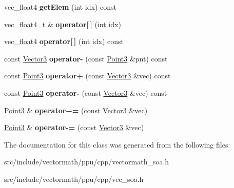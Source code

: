 \begin{DoxyCompactItemize}
\item 
\hypertarget{classVectormath_1_1Soa_1_1Point3_ac83e9baae7843966a73c44aa8ea8f191}{vec\-\_\-float4 {\bfseries get\-Elem} (int idx) const }\label{classVectormath_1_1Soa_1_1Point3_ac83e9baae7843966a73c44aa8ea8f191}

\item 
\hypertarget{classVectormath_1_1Soa_1_1Point3_a8358e39b24ff055400d2949036312a49}{vec\-\_\-float4\-\_\-t \& {\bfseries operator\mbox{[}$\,$\mbox{]}} (int idx)}\label{classVectormath_1_1Soa_1_1Point3_a8358e39b24ff055400d2949036312a49}

\item 
\hypertarget{classVectormath_1_1Soa_1_1Point3_a85d222b26f998d22adeba4b1a9c8506f}{vec\-\_\-float4 {\bfseries operator\mbox{[}$\,$\mbox{]}} (int idx) const }\label{classVectormath_1_1Soa_1_1Point3_a85d222b26f998d22adeba4b1a9c8506f}

\item 
\hypertarget{classVectormath_1_1Soa_1_1Point3_a82c1d800bd31dd5d3926d365d2c1acd0}{const \hyperlink{classVectormath_1_1Soa_1_1Vector3}{Vector3} {\bfseries operator-\/} (const \hyperlink{classVectormath_1_1Soa_1_1Point3}{Point3} \&pnt) const }\label{classVectormath_1_1Soa_1_1Point3_a82c1d800bd31dd5d3926d365d2c1acd0}

\item 
\hypertarget{classVectormath_1_1Soa_1_1Point3_ac77bb6fc67c50a0fe2ce7df62b08f5c4}{const \hyperlink{classVectormath_1_1Soa_1_1Point3}{Point3} {\bfseries operator+} (const \hyperlink{classVectormath_1_1Soa_1_1Vector3}{Vector3} \&vec) const }\label{classVectormath_1_1Soa_1_1Point3_ac77bb6fc67c50a0fe2ce7df62b08f5c4}

\item 
\hypertarget{classVectormath_1_1Soa_1_1Point3_abd8b13c7d8f776635be3de6dbe984e9f}{const \hyperlink{classVectormath_1_1Soa_1_1Point3}{Point3} {\bfseries operator-\/} (const \hyperlink{classVectormath_1_1Soa_1_1Vector3}{Vector3} \&vec) const }\label{classVectormath_1_1Soa_1_1Point3_abd8b13c7d8f776635be3de6dbe984e9f}

\item 
\hypertarget{classVectormath_1_1Soa_1_1Point3_a71f0b6d3d306c6aae2c38b4d7c565f5c}{\hyperlink{classVectormath_1_1Soa_1_1Point3}{Point3} \& {\bfseries operator+=} (const \hyperlink{classVectormath_1_1Soa_1_1Vector3}{Vector3} \&vec)}\label{classVectormath_1_1Soa_1_1Point3_a71f0b6d3d306c6aae2c38b4d7c565f5c}

\item 
\hypertarget{classVectormath_1_1Soa_1_1Point3_a8101822f9ee098b0f923d33b66a52f9f}{\hyperlink{classVectormath_1_1Soa_1_1Point3}{Point3} \& {\bfseries operator-\/=} (const \hyperlink{classVectormath_1_1Soa_1_1Vector3}{Vector3} \&vec)}\label{classVectormath_1_1Soa_1_1Point3_a8101822f9ee098b0f923d33b66a52f9f}

\end{DoxyCompactItemize}


The documentation for this class was generated from the following files\-:\begin{DoxyCompactItemize}
\item 
src/include/vectormath/ppu/cpp/vectormath\-\_\-soa.\-h\item 
src/include/vectormath/ppu/cpp/vec\-\_\-soa.\-h\end{DoxyCompactItemize}
